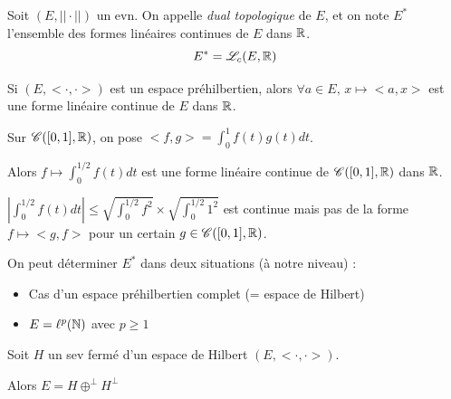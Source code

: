 
\begin{definition}{}{}
    Soit $(E, ||\cdot||)$ un evn. On appelle \emph{dual topologique} de $E$, 
    et on note $E^*$ l'ensemble des formes linéaires continues de $E$ dans $\mathbb{R}$.
    \[
        E^* = \mathscr L_c(E, \mathbb{R})
    \]
\end{definition}

\begin{exemple}
    Si $(E, <\cdot, \cdot>)$ est un espace préhilbertien, alors $\forall a \in E, \, x \mapsto <a, x>$ est une forme 
    linéaire continue de $E$ dans $\mathbb{R}$.

    \avspace Sur $\mathscr C([0, 1], \mathbb{R})$, on pose $<f, g> = \int_0^1 f(t) g(t) dt$.

    Alors $f \mapsto \int_0^{1/2} f(t) dt$ est une forme linéaire continue de $\mathscr C([0, 1], \mathbb{R})$ dans $\mathbb{R}$.

    $\displaystyle \left| \int_0^{1/2} f(t) dt \right| \leqslant \sqrt{\int_{0}^{1/2} f^2} \times \sqrt{\int_0^{1/2} 1^2} $ 
    est continue mais pas de la forme $f \mapsto <g, f>$ pour un certain $g \in \mathscr C([0, 1], \mathbb{R})$.
\end{exemple}

On peut déterminer $E^*$ dans deux situations (à notre niveau) : 
\begin{itemize}
    \item Cas d'un espace préhilbertien complet (= espace de Hilbert)
    \item $E = \ell^p(\mathbb{N})$ avec $p \geqslant 1$
\end{itemize}

\begin{theoreme}{}{}
    Soit $H$ un sev fermé d'un espace de Hilbert $(E, <\cdot, \cdot>)$.

    Alors $E = H \oplus^\perp H^\perp$
\end{theoreme}

